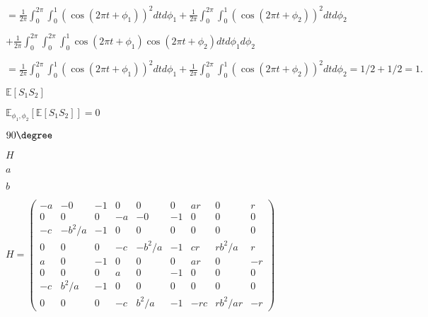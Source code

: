 \documentclass{article}
\def\lthtmlcheckvsize{\ifdim\ht\sizebox<\vsize 
  \ifdim\wd\sizebox<\hsize\expandafter\hfill\fi \expandafter\vfill
  \else\expandafter\vss\fi}%
\begin{document}
{\newpage\clearpage
{}%
$\displaystyle =\frac{1}{2 \pi}\int_0^{2 \pi} \int_0^1 (\cos(2 \pi t + \phi_1))^2dt d \phi_1 + \frac{1}{2 \pi}\int_0^{2 \pi} \int_0^1 ( \cos(2 \pi t + \phi_2))^2dt  d \phi_2$%
\lthtmlindisplaymathZ
\lthtmlcheckvsize\clearpage}

{\newpage\clearpage
{}%
$\displaystyle + \frac{1}{2 \pi}\int_0^{2 \pi} \int_0^{2 \pi}\int_0^1 \cos(2 \pi t + \phi_1) \cos(2 \pi t + \phi_2)dt d \phi_1 d \phi_2$%
\lthtmlindisplaymathZ
\lthtmlcheckvsize\clearpage}

{\newpage\clearpage
{}%
$\displaystyle = \frac{1}{2 \pi}\int_0^{2 \pi} \int_0^1 (\cos(2 \pi t + \phi_1))^2dt d \phi_1  + \frac{1}{2 \pi}\int_0^{2 \pi} \int_0^1 ( \cos(2 \pi t + \phi_2))^2dt  d \phi_2 = 1/2 +1/2 =1.$%
\lthtmlindisplaymathZ
\lthtmlcheckvsize\clearpage}

{\newpage\clearpage
{}%
$ \mathbb{E}[S_1 S_2]$%
\lthtmlindisplaymathZ
\lthtmlcheckvsize\clearpage}

{\newpage\clearpage
{}%
$ \mathbb{E}_{\phi_1,\phi_2} \left[\mathbb{E}\left[ S_1S_2\right]\right] =0$%
\lthtmlindisplaymathZ
\lthtmlcheckvsize\clearpage}

{\newpage\clearpage
{}%
$ 90 \degree$%
\lthtmlindisplaymathZ
\lthtmlcheckvsize\clearpage}

{\newpage\clearpage
{}%
$ H$%
\lthtmlindisplaymathZ
\lthtmlcheckvsize\clearpage}

{\newpage\clearpage
{}%
$ a$%
\lthtmlindisplaymathZ
\lthtmlcheckvsize\clearpage}

{\newpage\clearpage
{}%
$ b$%
\lthtmlindisplaymathZ
\lthtmlcheckvsize\clearpage}

{\newpage\clearpage
{}%
$\displaystyle H=
\begin{pmatrix}
  -a &-0 &-1 &0 &0 &0 &ar &0 &r \\
  0 &0 &0 &-a &-0 &-1 & 0& 0 &0 \\
  -c &-b^2/a& -1& 0& 0& 0 &0& 0& 0 \\
  0 &0 &0 &-c &-b^2/a &-1 &cr &rb^2/a& r\\
  a &0 &-1& 0& 0 &0 & ar &0 &-r \\
  0 &0 &0 &a &0 &-1 &0 &0 &0\\
  -c &b^2/a& -1& 0& 0& 0& 0& 0& 0 \\
  0 &0 &0 &-c &b^2/a &-1 &-rc &rb^2/ar &-r 
\end{pmatrix}
$%
\lthtmlindisplaymathZ
\lthtmlcheckvsize\clearpage}
\end{document}
